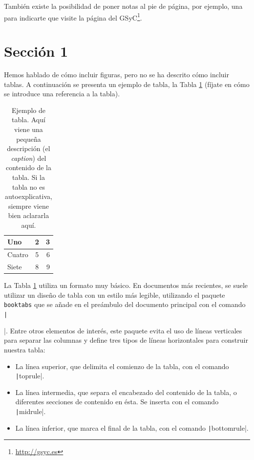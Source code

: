 También existe la posibilidad de poner notas al pie de página, por ejemplo, una para indicarte que visite la página del GSyC\footnote{\url{http://gsyc.es}}.

\section{Sección 1} 
\label{sec:seccion1}

Hemos hablado de cómo incluir figuras, pero no se ha descrito cómo incluir tablas.
A continuación se presenta un ejemplo de tabla, la Tabla \ref{tabla:ejemplo} (fíjate 
en cómo se introduce una referencia a la tabla).

\begin{table}[htb]
    \begin{center}
        \caption{Ejemplo de tabla. Aquí viene una pequeña descripción (el \emph{caption}) del contenido de la tabla. Si la tabla no es autoexplicativa, siempre viene bien aclararla aquí.}
        \label{tabla:ejemplo}
        \begin{tabular}{ | l | c | r |} %
            \hline
            Uno & 2 & 3 \\ \hline %
            Cuatro & 5 & 6 \\ \hline
            Siete & 8 & 9 \\
            \hline
        \end{tabular}
    \end{center}
\end{table}

La Tabla \ref{tabla:ejemplo} utiliza un formato muy básico. En documentos más recientes, se suele utilizar
un diseño de tabla con un estilo más legible, utilizando el paquete \texttt{booktabs} que se añade en el preámbulo
del documento principal con el comando \texttt|\usepackage{booktabs}|. Entre otros elementos de
interés, este paquete evita el uso de líneas verticales para separar las columnas y define tres tipos de líneas 
horizontales para construir nuestra tabla:

\begin{itemize}
    \item La línea superior, que delimita el comienzo de la tabla, con el comando \texttt|toprule|.
    
    \item La línea intermedia, que separa el encabezado del contenido de la tabla, o diferentes secciones de
    contenido en ésta. Se inserta con el comando \texttt|midrule|.
    
    \item La línea inferior, que marca el final de la tabla, con el comando \texttt|bottomrule|.
\end{itemize}

